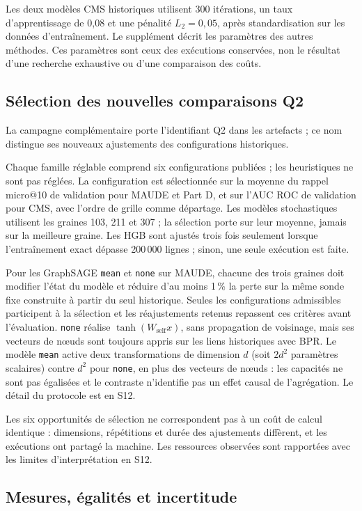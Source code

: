 Les deux modèles CMS historiques utilisent 300 itérations, un taux d'apprentissage de 0,08 et une pénalité $L_2=0,05$, après standardisation sur les données d'entraînement. Le supplément décrit les paramètres des autres méthodes. Ces paramètres sont ceux des exécutions conservées, non le résultat d'une recherche exhaustive ou d'une comparaison des coûts.
 
\subsection{Sélection des nouvelles comparaisons Q2}
\label{sec:q2-methods}
La campagne complémentaire porte l'identifiant Q2 dans les artefacts ; ce nom distingue ses nouveaux ajustements des configurations historiques.

Chaque famille réglable comprend six configurations publiées ; les heuristiques ne sont pas réglées. La configuration est sélectionnée sur la moyenne du rappel micro@10 de validation pour MAUDE et Part D, et sur l'AUC ROC de validation pour CMS, avec l'ordre de grille comme départage. Les modèles stochastiques utilisent les graines 103, 211 et 307 ; la sélection porte sur leur moyenne, jamais sur la meilleure graine. Les HGB sont ajustés trois fois seulement lorsque l'entraînement exact dépasse 200\,000 lignes ; sinon, une seule exécution est faite.

Pour les GraphSAGE \texttt{mean} et \texttt{none} sur MAUDE, chacune des trois graines doit modifier l'état du modèle et réduire d'au moins 1\,\% la perte sur la même sonde fixe construite à partir du seul historique. Seules les configurations admissibles participent à la sélection et les réajustements retenus repassent ces critères avant l'évaluation. \texttt{none} réalise $\tanh(W_{\mathrm{self}}x)$, sans propagation de voisinage, mais ses vecteurs de nœuds sont toujours appris sur les liens historiques avec BPR. Le modèle \texttt{mean} active deux transformations de dimension $d$ (soit $2d^2$ paramètres scalaires) contre $d^2$ pour \texttt{none}, en plus des vecteurs de nœuds : les capacités ne sont pas égalisées et le contraste n'identifie pas un effet causal de l'agrégation. Le détail du protocole est en S12.

Les six opportunités de sélection ne correspondent pas à un coût de calcul identique : dimensions, répétitions et durée des ajustements diffèrent, et les exécutions ont partagé la machine. Les ressources observées sont rapportées avec les limites d'interprétation en S12.

\subsection{Mesures, égalités et incertitude}
\label{sec:metrics}

